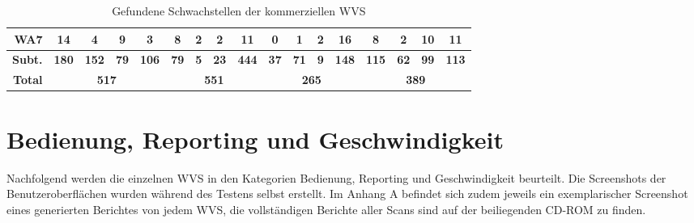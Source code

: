 \documentclass[12pt,oneside,a4paper,parskip,pointlessnumbers]{scrbook}
\begin{document}
\begin{table}[H]
\begin{tabular}{|r|c|c|c|c|c|c|c|c|c|c|c|c|c|c|c|c|}
        \hline
        \textbf{WA7} & 14           & 4            & 9           & 3            & 8           & 2          & 2           & 11           & 0           & 1           & 2          & 16           & 8            & 2           & 10          & 11            \\
        \hline
        \textbf{Subt.}        & \textbf{180} & \textbf{152} & \textbf{79} & \textbf{106} & \textbf{79} & \textbf{5} & \textbf{23} & \textbf{444} & \textbf{37} & \textbf{71} & \textbf{9} & \textbf{148} & \textbf{115} & \textbf{62} & \textbf{99} & \textbf{113}  \\
        \hline
        \textbf{Total}           & \multicolumn{4}{c|}{\textbf{517}}                        & \multicolumn{4}{c|}{\textbf{551}}                     & \multicolumn{4}{c|}{\textbf{265}}                     & \multicolumn{4}{c|}{\textbf{389}}                        \\
        \hline
      \end{tabular}
      \caption[Gefundene Schwachstellen der kommerziellen WVS]{Gefundene Schwachstellen der kommerziellen WVS}
    \end{table}


  \section{Bedienung, Reporting und Geschwindigkeit}
  Nachfolgend werden die einzelnen WVS in den Kategorien Bedienung, Reporting und Geschwindigkeit beurteilt. Die Screenshots der Benutzeroberflächen wurden während des Testens selbst erstellt. Im Anhang A befindet sich zudem jeweils ein exemplarischer Screenshot eines generierten Berichtes von jedem WVS, die vollständigen Berichte aller Scans sind auf der beiliegenden CD-ROM zu finden.
\end{document}
